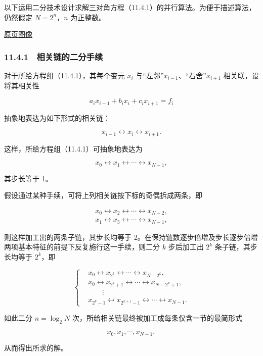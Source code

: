 \documentclass[
  10pt,
  fontset=fandol]{ctexart}
\begin{document}
以下运用二分技术设计求解三对角方程（11.4.1）的并行算法。为便于描述算法，仍然假定 \(N=2^n\)，\(n\) 为正整数。

\href{../../source-images/pdf-289.jpeg}{原页图像}

\subsubsection{11.4.1　相关链的二分手续}\label{ux76f8ux5173ux94feux7684ux4e8cux5206ux624bux7eed-1}

对于所给方程组（11.4.1），其每个变元 \(x_i\) 与``左邻''\(x_{i-1}\)、``右舍''\(x_{i+1}\) 相关联，设将其相关性

\[
a_ix_{i-1}+b_ix_i+c_ix_{i+1}=f_i
\]

抽象地表达为如下形式的相关链：

\[
x_{i-1}\leftrightarrow x_i\leftrightarrow x_{i+1}.
\]

这样，所给方程组（11.4.1）可抽象地表达为

\[
x_0\leftrightarrow x_1\leftrightarrow\cdots\leftrightarrow x_{N-1},
\]

其步长等于 1。

假设通过某种手续，可将上列相关链按下标的奇偶拆成两条，即

\[
\begin{gathered}
x_0\leftrightarrow x_2\leftrightarrow\cdots\leftrightarrow x_{N-2},\\
x_1\leftrightarrow x_3\leftrightarrow\cdots\leftrightarrow x_{N-1},
\end{gathered}
\]

则这样加工出的两条子链，其步长均等于 2。在保持链数逐步倍增及步长逐步倍增两项基本特征的前提下反复施行这一手续，则二分 \(k\) 步后加工出 \(2^k\) 条子链，其步长均等于 \(2^k\)，即

\[
\left\{
\begin{aligned}
&x_0\leftrightarrow x_{2^k}\leftrightarrow\cdots\leftrightarrow x_{N-2^k},\\
&x_0\leftrightarrow x_{2^k+1}\leftrightarrow\cdots\leftrightarrow x_{N-2^k+1},\\
&\qquad\vdots\\
&x_{2^k-1}\leftrightarrow x_{2^{k+1}-1}\leftrightarrow\cdots\leftrightarrow x_{N-1}.
\end{aligned}
\right.
\tag{11.4.2}
\]

如此二分 \(n=\log_2 N\) 次，所给相关链最终被加工成每条仅含一节的最简形式

\[
x_0,x_1,\cdots,x_{N-1},
\]

从而得出所求的解。
\end{document}
